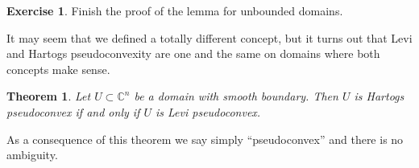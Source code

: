 \documentclass[12pt,openany]{book}
\newcommand{\C}{{\mathbb{C}}}
\theoremstyle{plain}
\newtheorem{thm}{Theorem}[section]
\theoremstyle{remark}
\theoremstyle{definition}
\newenvironment{exbox}{%
    \def\FrameCommand{\vrule width 1pt \relax\hspace {10pt}}%
    \MakeFramed {\advance \hsize -\width \FrameRestore }%
}{%
    \endMakeFramed
}
\theoremstyle{exercise}
\newtheorem{exercise}{Exercise}[section]
\theoremstyle{example}
\begin{document}
\begin{exbox}
\begin{exercise}
Finish the proof of the lemma for unbounded domains.
\end{exercise}
\end{exbox}



It may seem that we defined a totally different concept, but it turns
out that Levi and Hartogs pseudoconvexity are one and the same on domains
where both concepts make sense.

\begin{thm}
Let $U \subset \C^n$ be a domain with smooth boundary. 
Then $U$ is Hartogs pseudoconvex if and only if $U$ is Levi pseudoconvex.
\end{thm}

As a consequence of this theorem we say simply ``pseudoconvex'' and there
is no ambiguity.
\end{document}
